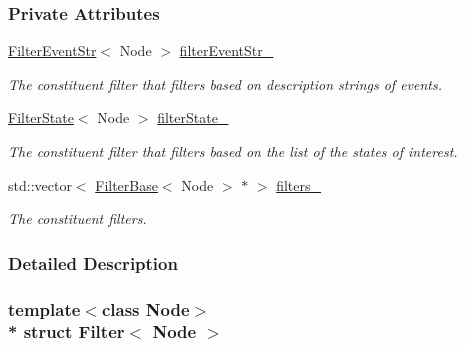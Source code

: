 \subsubsection*{Private Attributes}
\begin{DoxyCompactItemize}
\item 
\hyperlink{structFilterEventStr}{Filter\+Event\+Str}$<$ Node $>$ \hyperlink{structFilter_ad61260cca45f5f489673daccf84dd7f4}{filter\+Event\+Str\+\_\+}\hypertarget{structFilter_ad61260cca45f5f489673daccf84dd7f4}{}\label{structFilter_ad61260cca45f5f489673daccf84dd7f4}

\begin{DoxyCompactList}\small\item\em The constituent filter that filters based on description strings of events. \end{DoxyCompactList}\item 
\hyperlink{structFilterState}{Filter\+State}$<$ Node $>$ \hyperlink{structFilter_a9548af9be92bce2dfb95169e25c28be3}{filter\+State\+\_\+}\hypertarget{structFilter_a9548af9be92bce2dfb95169e25c28be3}{}\label{structFilter_a9548af9be92bce2dfb95169e25c28be3}

\begin{DoxyCompactList}\small\item\em The constituent filter that filters based on the list of the states of interest. \end{DoxyCompactList}\item 
std\+::vector$<$ \hyperlink{structFilterBase}{Filter\+Base}$<$ Node $>$ $\ast$ $>$ \hyperlink{structFilter_ae6670e0ac76c2c17a1ab94b4a955f252}{filters\+\_\+}\hypertarget{structFilter_ae6670e0ac76c2c17a1ab94b4a955f252}{}\label{structFilter_ae6670e0ac76c2c17a1ab94b4a955f252}

\begin{DoxyCompactList}\small\item\em The constituent filters. \end{DoxyCompactList}\end{DoxyCompactItemize}


\subsubsection{Detailed Description}
\subsubsection*{template$<$class Node$>$\\*
struct Filter$<$ Node $>$}

